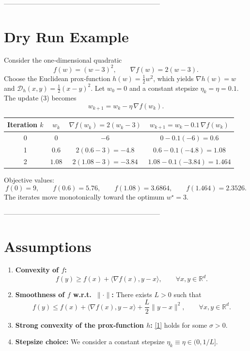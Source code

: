 \documentclass{article}
\newcommand{\D}{\mathcal{D}}
\newcommand{\R}{\mathbb{R}}
\begin{document}
---------------------------------------------------------------------

\section*{Dry Run Example}
Consider the one‑dimensional quadratic
\[
f(w)=(w-3)^{2},\qquad \nabla f(w)=2(w-3).
\]
Choose the Euclidean prox‑function $h(w)=\tfrac12 w^{2}$, which yields
$\nabla h(w)=w$ and $\D_{h}(x,y)=\tfrac12 (x-y)^{2}$.
Let $w_{0}=0$ and a constant stepsize $\eta_{k}= \eta=0.1$.
The update (3) becomes
\[
w_{k+1}= w_{k}-\eta\,\nabla f(w_{k}).
\]

\begin{center}
\begin{tabular}{c|c|c|c}
Iteration $k$ & $w_{k}$ & $\nabla f(w_{k})=2(w_{k}-3)$ & $w_{k+1}=w_{k}-0.1\,\nabla f(w_{k})$\\\hline
0 & $0$ & $-6$ & $0-0.1(-6)=0.6$\\
1 & $0.6$ & $2(0.6-3)=-4.8$ & $0.6-0.1(-4.8)=1.08$\\
2 & $1.08$ & $2(1.08-3)=-3.84$ & $1.08-0.1(-3.84)=1.464$\\
\end{tabular}
\end{center}

Objective values:
\[
f(0)=9,\qquad f(0.6)=5.76,\qquad f(1.08)=3.6864,\qquad f(1.464)=2.3526.
\]
The iterates move monotonically toward the optimum $w^{\star}=3$.

---------------------------------------------------------------------

\section*{Assumptions}
\begin{enumerate}
\item \textbf{Convexity of $f$:}
\[
f(y)\ge f(x)+\langle\nabla f(x),y-x\rangle,\qquad\forall x,y\in\R^{d}.
\tag{A1}
\]

\item \textbf{Smoothness of $f$ w.r.t.\ $\|\cdot\|$:}
There exists $L>0$ such that
\[
f(y)\le f(x)+\langle\nabla f(x),y-x\rangle
+\frac{L}{2}\|y-x\|^{2},
\qquad\forall x,y\in\R^{d}.
\tag{A2}
\]

\item \textbf{Strong convexity of the prox‑function $h$:}
\eqref{1} holds for some $\sigma>0$.

\item \textbf{Stepsize choice:}
We consider a constant stepsize $\eta_{k}\equiv\eta\in(0,1/L]$.
\end{enumerate}
\end{document}
